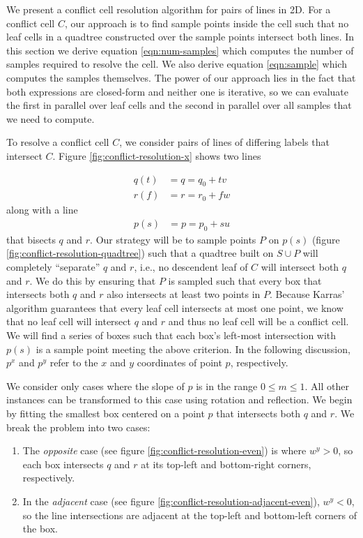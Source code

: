 \documentclass[final,3p,times,twocolumn]{elsarticle}
\begin{document}
We present a conflict cell resolution algorithm for pairs of lines in 2D. For a conflict cell $C$, our approach is to find sample points inside the cell such that no leaf cells in a quadtree constructed over the sample points intersect both lines. In this section we derive equation \eqref{eqn:num-samples} which computes the number of samples required to resolve the cell. We also derive equation \eqref{eqn:sample} which computes the samples themselves. The power of our approach lies in the fact that both expressions are closed-form and neither one is iterative, so we can evaluate the first in parallel over leaf cells and the second in parallel over all samples that we need to compute.

To resolve a conflict cell $C$, we consider pairs of lines of differing labels that intersect $C$. Figure \ref{fig:conflict-resolution-x} shows two lines

\begin{align}
q(t) &= q = q_0 + tv \label{eqn:q} \\
r(f) &= r = r_0 + fw \label{eqn:r}
\end{align}
along with a line
\begin{align}
p(s) &= p = p_0 + su \label{eqn:p}
\end{align}
that bisects $q$ and $r$. Our strategy will be to sample points $P$ on $p(s)$ (figure \ref{fig:conflict-resolution-quadtree}) such that a quadtree built on $S \cup P$ will completely ``separate'' $q$ and $r$, i.e., no descendent leaf of $C$ will intersect both $q$ and $r$. We do this by ensuring that $P$ is sampled such that every box that intersects both $q$ and $r$ also intersects at least two points in $P$. Because Karras' algorithm guarantees that every leaf cell intersects at most one point, we know that no leaf cell will intersect $q$ and $r$ and thus no leaf cell will be a conflict cell. We will find a series of boxes such that each box's left-most intersection with $p(s)$ is a sample point meeting the above criterion. In the following discussion, $p^x$ and $p^y$ refer to the $x$ and $y$ coordinates of point $p$, respectively.

We consider only cases where the slope of $p$ is in the range $0 \le m \le 1$. All other instances can be transformed to this case using rotation and reflection. We begin by fitting the smallest box centered on a point $p$ that intersects both $q$ and $r$. We break the problem into two cases:
\begin{enumerate}
 \item The \textit{opposite} case (see figure \ref{fig:conflict-resolution-even}) is where $w^y > 0$, so each box intersects $q$ and $r$ at its top-left and bottom-right corners, respectively.
 \item In the \textit{adjacent} case (see figure \ref{fig:conflict-resolution-adjacent-even}), $w^y < 0$, so the line intersections are adjacent at the top-left and bottom-left corners of the box.
\end{enumerate}
\end{document}
